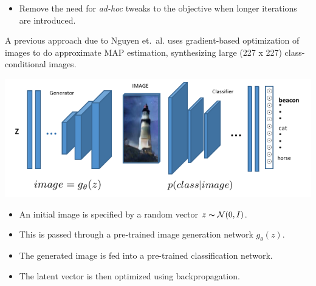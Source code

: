\documentclass[landscape,a0b,final,a4resizeable]{include/a0poster}
\begin{document}
\begin{poster}
\begin{multicols}{3}
\begin{itemize}
	\item Remove the need for \emph{ad-hoc} tweaks to the objective when longer iterations are introduced.
\end{itemize}

\vspace{0.5in}

% 
A previous approach due to Nguyen et.\ al. uses gradient-based optimization of images to do approximate 
 MAP estimation, synthesizing large (227 x 227) class-conditional images.\\

\begin{center} 
  \centering
  \includegraphics{figures/img}
  \label{fig:net}
\end{center}

\begin{itemize}
\item An initial image is specified by a random vector $z \thicksim \mathcal{N}(0, I)$.
 \item This is passed through a pre-trained image generation network $g_\theta(z)$.
\item The generated image is fed into a pre-trained classification network.
 \item The latent vector is then optimized using backpropagation.
\end{itemize}


\end{multicols}
\end{poster}
\end{document}
